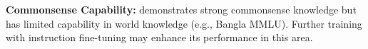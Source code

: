 
\noindent
\textbf{Commonsense Capability:} \titu{} demonstrates strong commonsense knowledge but has limited capability in world knowledge (e.g., Bangla MMLU). Further training with instruction fine-tuning may enhance its performance in this area.

















